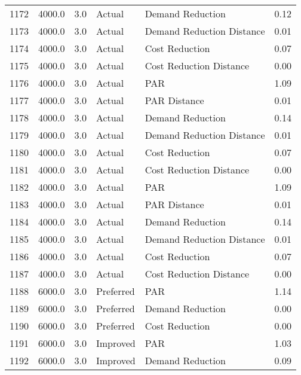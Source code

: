 \begin{longtable}{lrrllr}
1172 &       4000.0 &     3.0 &         Actual &           Demand Reduction &   0.12 \\
1173 &       4000.0 &     3.0 &         Actual &  Demand Reduction Distance &   0.01 \\
1174 &       4000.0 &     3.0 &         Actual &             Cost Reduction &   0.07 \\
1175 &       4000.0 &     3.0 &         Actual &    Cost Reduction Distance &   0.00 \\
1176 &       4000.0 &     3.0 &         Actual &                        PAR &   1.09 \\
1177 &       4000.0 &     3.0 &         Actual &               PAR Distance &   0.01 \\
1178 &       4000.0 &     3.0 &         Actual &           Demand Reduction &   0.14 \\
1179 &       4000.0 &     3.0 &         Actual &  Demand Reduction Distance &   0.01 \\
1180 &       4000.0 &     3.0 &         Actual &             Cost Reduction &   0.07 \\
1181 &       4000.0 &     3.0 &         Actual &    Cost Reduction Distance &   0.00 \\
1182 &       4000.0 &     3.0 &         Actual &                        PAR &   1.09 \\
1183 &       4000.0 &     3.0 &         Actual &               PAR Distance &   0.01 \\
1184 &       4000.0 &     3.0 &         Actual &           Demand Reduction &   0.14 \\
1185 &       4000.0 &     3.0 &         Actual &  Demand Reduction Distance &   0.01 \\
1186 &       4000.0 &     3.0 &         Actual &             Cost Reduction &   0.07 \\
1187 &       4000.0 &     3.0 &         Actual &    Cost Reduction Distance &   0.00 \\
1188 &       6000.0 &     3.0 &      Preferred &                        PAR &   1.14 \\
1189 &       6000.0 &     3.0 &      Preferred &           Demand Reduction &   0.00 \\
1190 &       6000.0 &     3.0 &      Preferred &             Cost Reduction &   0.00 \\
1191 &       6000.0 &     3.0 &       Improved &                        PAR &   1.03 \\
1192 &       6000.0 &     3.0 &       Improved &           Demand Reduction &   0.09 \\

\end{longtable}
